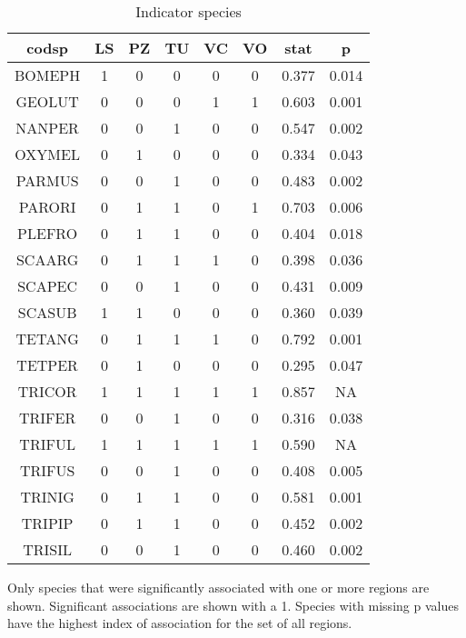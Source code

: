 \begin{table}[!h]
\centering
\caption{\label{tab:ind_spp}Indicator species}
\centering
\fontsize{9}{11}\selectfont
\begin{threeparttable}
\begin{tabular}[t]{cccccccc}
\hline\hline
codsp & LS & PZ & TU & VC & VO & stat & p\\
\midrule
BOMEPH & 1 & 0 & 0 & 0 & 0 & 0.377 & 0.014\\
GEOLUT & 0 & 0 & 0 & 1 & 1 & 0.603 & 0.001\\
NANPER & 0 & 0 & 1 & 0 & 0 & 0.547 & 0.002\\
OXYMEL & 0 & 1 & 0 & 0 & 0 & 0.334 & 0.043\\
PARMUS & 0 & 0 & 1 & 0 & 0 & 0.483 & 0.002\\
PARORI & 0 & 1 & 1 & 0 & 1 & 0.703 & 0.006\\
PLEFRO & 0 & 1 & 1 & 0 & 0 & 0.404 & 0.018\\
SCAARG & 0 & 1 & 1 & 1 & 0 & 0.398 & 0.036\\
SCAPEC & 0 & 0 & 1 & 0 & 0 & 0.431 & 0.009\\
SCASUB & 1 & 1 & 0 & 0 & 0 & 0.360 & 0.039\\
TETANG & 0 & 1 & 1 & 1 & 0 & 0.792 & 0.001\\
TETPER & 0 & 1 & 0 & 0 & 0 & 0.295 & 0.047\\
TRICOR & 1 & 1 & 1 & 1 & 1 & 0.857 & NA\\
TRIFER & 0 & 0 & 1 & 0 & 0 & 0.316 & 0.038\\
TRIFUL & 1 & 1 & 1 & 1 & 1 & 0.590 & NA\\
TRIFUS & 0 & 0 & 1 & 0 & 0 & 0.408 & 0.005\\
TRINIG & 0 & 1 & 1 & 0 & 0 & 0.581 & 0.001\\
TRIPIP & 0 & 1 & 1 & 0 & 0 & 0.452 & 0.002\\
TRISIL & 0 & 0 & 1 & 0 & 0 & 0.460 & 0.002\\
\hline\hline
\end{tabular}
\begin{tablenotes}[para]
\item Only species that were significantly associated with one or more regions are shown. Significant associations are shown with a 1. Species with missing p values have the highest index of association for the set of all regions.
\end{tablenotes}
\end{threeparttable}
\end{table}
